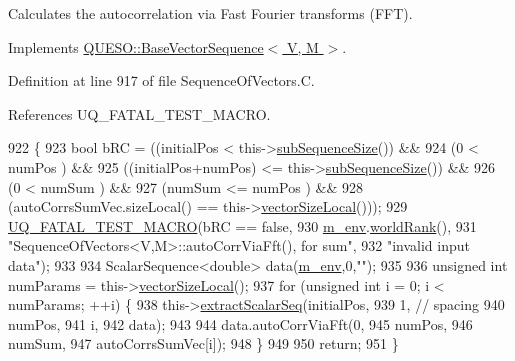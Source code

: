 Calculates the autocorrelation via Fast Fourier transforms (F\-F\-T). 



Implements \hyperlink{class_q_u_e_s_o_1_1_base_vector_sequence_af9f2478ed4112aa615caef21bf26ab35}{Q\-U\-E\-S\-O\-::\-Base\-Vector\-Sequence$<$ V, M $>$}.



Definition at line 917 of file Sequence\-Of\-Vectors.\-C.



References U\-Q\-\_\-\-F\-A\-T\-A\-L\-\_\-\-T\-E\-S\-T\-\_\-\-M\-A\-C\-R\-O.


\begin{DoxyCode}
922 \{
923   \textcolor{keywordtype}{bool} bRC = ((initialPos             <  this->\hyperlink{class_q_u_e_s_o_1_1_sequence_of_vectors_a0224bd3e961d86af5d2886301c0c2b86}{subSequenceSize}()) &&
924               (0                      <  numPos                 ) &&
925               ((initialPos+numPos)    <= this->\hyperlink{class_q_u_e_s_o_1_1_sequence_of_vectors_a0224bd3e961d86af5d2886301c0c2b86}{subSequenceSize}()) &&
926               (0                      <  numSum                 ) &&
927               (numSum                 <= numPos                 ) &&
928               (autoCorrsSumVec.sizeLocal() == this->\hyperlink{class_q_u_e_s_o_1_1_base_vector_sequence_a2fefedf9e5b90f22881103b3f92555f6}{vectorSizeLocal}()));
929   \hyperlink{_defines_8h_a56d63d18d0a6d45757de47fcc06f574d}{UQ\_FATAL\_TEST\_MACRO}(bRC == \textcolor{keyword}{false},
930                       \hyperlink{class_q_u_e_s_o_1_1_base_vector_sequence_a8e8824d2a63c5a43bcc6473e3a0491e8}{m\_env}.\hyperlink{class_q_u_e_s_o_1_1_base_environment_a78b57112bbd0e6dd0e8afec00b40ffa7}{worldRank}(),
931                       \textcolor{stringliteral}{"SequenceOfVectors<V,M>::autoCorrViaFft(), for sum"},
932                       \textcolor{stringliteral}{"invalid input data"});
933 
934   ScalarSequence<double> data(\hyperlink{class_q_u_e_s_o_1_1_base_vector_sequence_a8e8824d2a63c5a43bcc6473e3a0491e8}{m\_env},0,\textcolor{stringliteral}{""});
935 
936   \textcolor{keywordtype}{unsigned} \textcolor{keywordtype}{int} numParams = this->\hyperlink{class_q_u_e_s_o_1_1_base_vector_sequence_a2fefedf9e5b90f22881103b3f92555f6}{vectorSizeLocal}();
937   \textcolor{keywordflow}{for} (\textcolor{keywordtype}{unsigned} \textcolor{keywordtype}{int} i = 0; i < numParams; ++i) \{
938     this->\hyperlink{class_q_u_e_s_o_1_1_sequence_of_vectors_ac977b3b26a6af2ae727671f1246262fd}{extractScalarSeq}(initialPos,
939                            1, \textcolor{comment}{// spacing}
940                            numPos,
941                            i,
942                            data);
943 
944     data.autoCorrViaFft(0,
945                         numPos,
946                         numSum,
947                         autoCorrsSumVec[i]);
948   \}
949 
950   \textcolor{keywordflow}{return};
951 \}
\end{DoxyCode}
